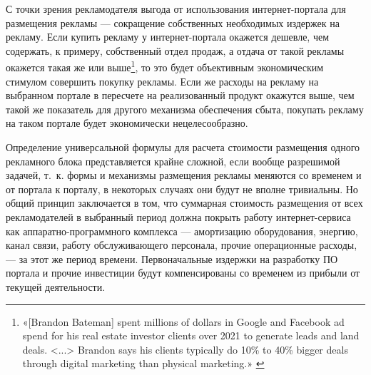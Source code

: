 \documentclass{article}
\begin{document}
С точки зрения рекламодателя выгода от использования интернет-портала для размещения рекламы — сокращение собственных необходимых издержек на рекламу. Если купить рекламу у интернет-портала окажется дешевле, чем содержать, к примеру, собственный отдел продаж, а отдача от такой рекламы окажется такая же или выше\footnote{«[Brandon Bateman] spent millions of dollars in Google and Facebook ad spend for his real estate investor clients over 2021 to generate leads and land deals. <...> Brandon says his clients typically do 10\% to 40\% bigger deals through digital marketing than physical marketing.» \cite{roiSEOvsGooglevsFacebook}}, то это будет объективным экономическим стимулом совершить покупку рекламы. Если же расходы на рекламу на выбранном портале в пересчете на реализованный продукт окажутся выше, чем такой же показатель для другого механизма обеспечения сбыта, покупать рекламу на таком портале будет экономически нецелесообразно.

Определение универсальной формулы для расчета стоимости размещения одного рекламного блока представляется крайне сложной, если вообще разрешимой задачей, т.~к. формы и механизмы размещения рекламы меняются со временем и от портала к порталу, в некоторых случаях они будут не вполне тривиальны. Но общий принцип заключается в том, что суммарная стоимость размещения от всех рекламодателей в выбранный период должна покрыть работу интернет-сервиса как аппаратно-программного комплекса — амортизацию оборудования, энергию, канал связи, работу обслуживающего персонала, прочие операционные расходы, — за этот же период времени. Первоначальные издержки на разработку ПО портала и прочие инвестиции будут компенсированы со временем из прибыли от текущей деятельности.
\end{document}
